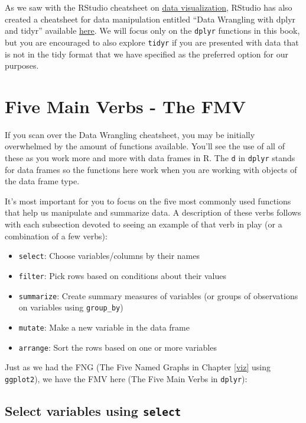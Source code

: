 \documentclass[]{tufte-book}
\providecommand{\tightlist}{%
  \setlength{\itemsep}{0pt}\setlength{\parskip}{0pt}}
\begin{document}
As we saw with the RStudio cheatsheet on
\href{https://www.rstudio.com/wp-content/uploads/2015/12/ggplot2-cheatsheet-2.0.pdf}{data
visualization}, RStudio has also created a cheatsheet for data
manipulation entitled ``Data Wrangling with dplyr and tidyr'' available
\href{https://www.rstudio.com/wp-content/uploads/2015/02/data-wrangling-cheatsheet.pdf}{here}.
We will focus only on the \texttt{dplyr} functions in this book, but you
are encouraged to also explore \texttt{tidyr} if you are presented with
data that is not in the tidy format that we have specified as the
preferred option for our purposes.

\section{Five Main Verbs - The FMV}\label{five-main-verbs---the-fmv}

If you scan over the Data Wrangling cheatsheet, you may be initially
overwhelmed by the amount of functions available. You'll see the use of
all of these as you work more and more with data frames in R. The
\texttt{d} in \texttt{dplyr} stands for data frames so the functions
here work when you are working with objects of the data frame type.

It's most important for you to focus on the five most commonly used
functions that help us manipulate and summarize data. A description of
these verbs follows with each subsection devoted to seeing an example of
that verb in play (or a combination of a few verbs):

\begin{itemize}
\tightlist
\item
  \texttt{select}: Choose variables/columns by their names
\item
  \texttt{filter}: Pick rows based on conditions about their values
\item
  \texttt{summarize}: Create summary measures of variables (or groups of
  observations on variables using \texttt{group\_by})
\item
  \texttt{mutate}: Make a new variable in the data frame
\item
  \texttt{arrange}: Sort the rows based on one or more variables
\end{itemize}

Just as we had the FNG (The Five Named Graphs in Chapter \ref{viz} using
\texttt{ggplot2}), we have the FMV here (The Five Main Verbs in
\texttt{dplyr}):

\subsection{\texorpdfstring{Select variables using
\texttt{select}}{Select variables using select}}\label{select-variables-using-select}
\end{document}
